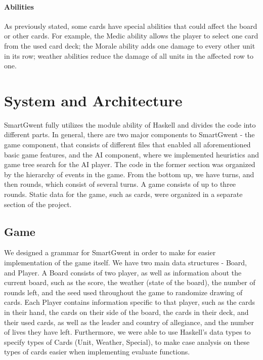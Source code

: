 \documentclass[numbers]{sigplanconf}
\begin{document}
\paragraph{Abilities}
As previously stated, some cards have special abilities that could affect the board or other cards. For example, the Medic ability allows the player to select one card from the used card deck; the Morale ability adds one damage to every other unit in its row; weather abilities reduce the damage of all units in the affected row to one.


\section{System and Architecture}
SmartGwent fully utilizes the module ability of Haskell and divides the code into different parts. In general, there are two major components to SmartGwent - the game component, that consists of different files that enabled all aforementioned basic game features, and the AI component, where we implemented heuristics and game tree search for the AI player. The code in the former section was organized by the hierarchy of events in the game. From the bottom up, we have turns, and then rounds, which consist of several turns. A game consists of up to three rounds. Static data for the game, such as cards, were organized in a separate section of the project. 
\subsection{Game}
We designed a grammar for SmartGwent in order to make for easier implementation of the game itself. We have two main data structures - Board, and Player. A Board consists of two player, as well as information about the current board, such as the score, the weather (state of the board), the number of rounds left, and the seed used throughout the game to randomize drawing of cards. Each Player contains information specific to that player, such as the cards in their hand, the cards on their side of the board, the cards in their deck, and their used cards, as well as the leader and country of allegiance, and the number of lives they have left. Furthermore, we were able to use Haskell's data types to specify types of Cards (Unit, Weather, Special), to make case analysis on these types of cards easier when implementing evaluate functions.
\end{document}
